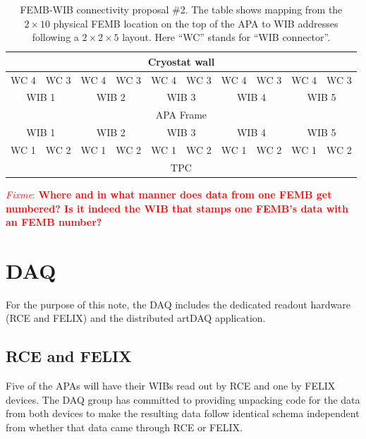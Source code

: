 \documentclass[pdftex,12pt,letter]{article}
\newcommand{\fixme}[1]{\textcolor{red}{\textit{Fixme}: \textbf{#1}}}
\begin{document}
\begin{table}[htp]
  \label{tab:femb-wib-2}
  \centering
  \begin{tabular}[h]{|c|c|c|c|c|c|c|c|c|c|}
    \hline
    \multicolumn{10}{|c|}{Cryostat wall} \\
    \hline
    WC 4 & WC 3 & WC 4 & WC 3 & WC 4 & WC 3 & WC 4 & WC 3 & WC 4 & WC 3 \\
    \multicolumn{2}{|c|}{WIB 1} & \multicolumn{2}{c|}{WIB 2} & \multicolumn{2}{c|}{WIB 3} & \multicolumn{2}{c|}{WIB 4} & \multicolumn{2}{c|}{WIB 5} \\
    \hline
    \multicolumn{10}{|c|}{APA Frame} \\
    \hline
    \multicolumn{2}{|c|}{WIB 1} & \multicolumn{2}{c|}{WIB 2} & \multicolumn{2}{c|}{WIB 3} & \multicolumn{2}{c|}{WIB 4} & \multicolumn{2}{c|}{WIB 5} \\
    WC 1 & WC 2 & WC 1 & WC 2 & WC 1 & WC 2 & WC 1 & WC 2 & WC 1 & WC 2 \\
    \hline
    \multicolumn{10}{|c|}{TPC} \\
    \hline
  \end{tabular}
  \caption{FEMB-WIB connectivity proposal \#2.  The table shows mapping from the $2\times10$ physical FEMB location on the top of the APA to WIB addresses following a $2\times2\times5$ layout.  Here ``WC'' stands for ``WIB connector''.}

\end{table}

\fixme{Where and in what manner does data from one FEMB get numbered?  Is it indeed the WIB that stamps one FEMB's data with an FEMB number?}


\section{DAQ}

For the purpose of this note, the DAQ includes the dedicated readout
hardware (RCE and FELIX) and the distributed artDAQ application.

\subsection{RCE and FELIX}

Five of the APAs will have their WIBs read out by RCE and one by FELIX
devices.  The DAQ group has committed to providing unpacking code for
the data from both devices to make the resulting data follow identical
schema independent from whether that data came through RCE or FELIX.
\end{document}
